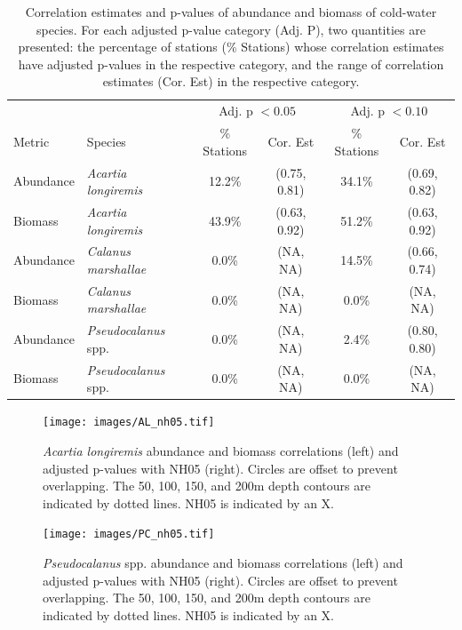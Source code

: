 \documentclass[preprint, authoryear, 12pt]{elsarticle}
\begin{document}
\begin{table}[ht]
    \footnotesize
    \centering
    \begin{tabular}{llcccc}
    \hline
    \hline
          & & \multicolumn{2}{c}{Adj. p $< 0.05$} & \multicolumn{2}{c}{Adj. p $< 0.10$} \\
          Metric & Species & \% Stations & Cor. Est & \% Stations & Cor. Est \\
         \hline
         Abundance & \textit{Acartia longiremis} & 12.2\% &  (0.75, 0.81) & 34.1\% & (0.69, 0.82) \\
         Biomass & \textit{Acartia longiremis}  & 43.9\% &  (0.63, 0.92) & 51.2\% & (0.63, 0.92) \\
         Abundance & \textit{Calanus marshallae}  & 0.0\% &  (NA, NA) & 14.5\% & (0.66, 0.74) \\
         Biomass & \textit{Calanus marshallae}  & 0.0\% &  (NA, NA) & 0.0\% & (NA, NA) \\
         Abundance & \textit{Pseudocalanus} spp.  & 0.0\% &  (NA, NA) & 2.4\% & (0.80, 0.80) \\
         Biomass & \textit{Pseudocalanus} spp.  & 0.0\% &  (NA, NA) & 0.0\% & (NA, NA) \\
         \hline
    \end{tabular}
    \caption{Correlation estimates and p-values of abundance and biomass of cold-water species. For each adjusted p-value category (Adj. P), two quantities are presented: the percentage of stations (\% Stations) whose correlation estimates have adjusted p-values in the respective category, and the range of correlation estimates (Cor. Est) in the respective category.}
    \label{tab:cold_sp_nh05}
\end{table}


\begin{figure}[ht]
\centering
  \texttt{[image: images/AL\_nh05.tif]}
  \caption{\textit{Acartia longiremis} abundance and biomass correlations (left) and adjusted p-values with NH05 (right).  Circles are offset to prevent overlapping. The 50, 100, 150, and 200m depth contours are indicated by dotted lines.  NH05 is indicated by an X.}
  \label{fig:AL_nh05}
  \texttt{[image: images/PC\_nh05.tif]}
  \caption{\textit{Pseudocalanus} spp. abundance and biomass correlations (left) and adjusted p-values with NH05 (right).  Circles are offset to prevent overlapping. The 50, 100, 150, and 200m depth contours are indicated by dotted lines.  NH05 is indicated by an X.}
  \label{fig:PC_nh05}
\end{figure}
\end{document}
